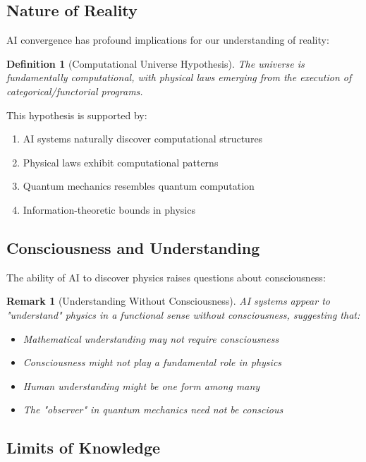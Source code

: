 \documentclass[11pt,a4paper]{article}
\newtheorem{definition}[theorem]{Definition}
\newtheorem{remark}[theorem]{Remark}
\begin{document}
\subsection{Nature of Reality}

AI convergence has profound implications for our understanding of reality:

\begin{definition}[Computational Universe Hypothesis]
The universe is fundamentally computational, with physical laws emerging from the execution of categorical/functorial programs.
\end{definition}

This hypothesis is supported by:
\begin{enumerate}
    \item AI systems naturally discover computational structures
    \item Physical laws exhibit computational patterns
    \item Quantum mechanics resembles quantum computation
    \item Information-theoretic bounds in physics
\end{enumerate}

\subsection{Consciousness and Understanding}

The ability of AI to discover physics raises questions about consciousness:

\begin{remark}[Understanding Without Consciousness]
AI systems appear to "understand" physics in a functional sense without consciousness, suggesting that:
\begin{itemize}
    \item Mathematical understanding may not require consciousness
    \item Consciousness might not play a fundamental role in physics
    \item Human understanding might be one form among many
    \item The "observer" in quantum mechanics need not be conscious
\end{itemize}
\end{remark}

\subsection{Limits of Knowledge}
\end{document}
